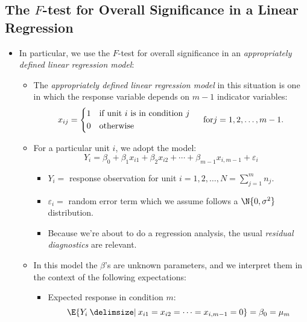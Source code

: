\subsection{The \texorpdfstring{$ F $}{F}-test for Overall Significance in a Linear Regression}
\begin{itemize}
      \item In particular, we use the $ F $-test for overall significance in an
            \emph{appropriately defined linear regression model}:
            \begin{itemize}
                  \item The \emph{appropriately defined linear regression model}
                        in this situation is one in which the response
                        variable depends on $ m-1 $ indicator variables:
                        \[ x_{ij}=\begin{cases*}
                                    1 & if unit $ i $ is in condition $ j $ \\
                                    0 & otherwise
                              \end{cases*}\quad\text{for}j=1,2,\ldots,m-1. \]
                  \item For a particular unit $ i $, we adopt the model:
                        \[ Y_{i}=\beta_0+\beta_1x_{i1}+\beta_2x_{i2}+\cdots+\beta_{m-1}x_{i,m-1}+\varepsilon_i \]
                        \begin{itemize}
                              \item $ Y_i = $ response observation for unit $ i=1,2,\ldots,N=\sum_{j=1}^{m} n_j $.
                              \item $ \varepsilon_i = $ random error term which we assume follows a $ \N{0,\sigma^2} $ distribution.
                              \item Because we're about to do a regression analysis, the usual \emph{residual diagnostics} are relevant.
                        \end{itemize}
                  \item In this model the $ \beta $'s are unknown parameters,
                        and we interpret them in the context of the
                        following expectations:
                        \begin{itemize}
                              \item Expected response in condition $ m $:
                                    \[ \E{Y_i\given x_{i1}=x_{i2}=\cdots=x_{i,m-1}=0}=\beta_0=\mu_m \]

\end{itemize}
\end{itemize}
\end{itemize}
